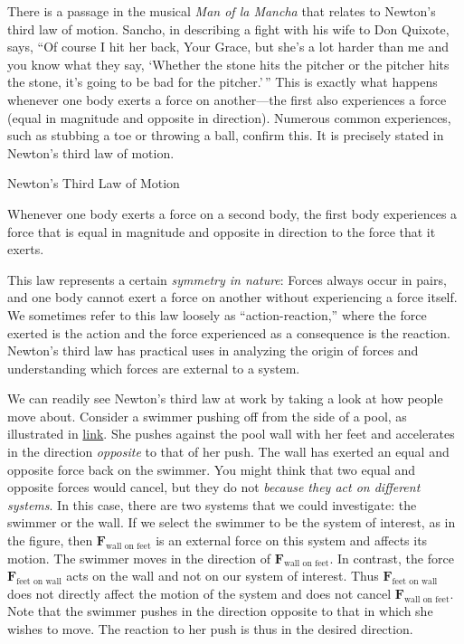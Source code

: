 \documentclass[
]{book}
\begin{document}
There is a passage in the musical \emph{Man of la
Mancha} that relates to Newton's third law
of motion. Sancho, in describing a fight with his wife to Don Quixote,
says, ``Of course I hit her back, Your Grace, but she's a lot harder than
me and you know what they say, `Whether the stone hits the pitcher or
the pitcher hits the stone, it's going to be bad for the pitcher.'\,'' This
is exactly what happens whenever one body exerts a force on
another---the first also experiences a force (equal in magnitude and
opposite in direction). Numerous common experiences, such as stubbing a
toe or throwing a ball, confirm this. It is precisely stated in
\protect\hypertarget{import-auto-id1260844}{}{Newton's third law of motion}.

\hypertarget{fs-id2688761}{}
Newton's Third Law of Motion

Whenever one body exerts a force on a second body, the first body
experiences a force that is equal in magnitude and opposite in direction
to the force that it exerts.

This law represents a certain \emph{symmetry in nature}: Forces always occur
in pairs, and one body cannot exert a force on another without
experiencing a force itself. We sometimes refer to this law loosely as
``action-reaction,'' where the force exerted is the action and the force
experienced as a consequence is the reaction. Newton's third law has
practical uses in analyzing the origin of forces and understanding which
forces are external to a system.

We can readily see Newton's third law at work by taking a look at how
people move about. Consider a swimmer pushing off from the side of a
pool, as illustrated in
\protect\hyperlink{import-auto-id2338100}{link}. She pushes
against the pool wall with her feet and accelerates in the direction
\emph{opposite} to that of her push. The wall has exerted an equal and
opposite force back on the swimmer. You might think that two equal and
opposite forces would cancel, but they do not \emph{because they act on
different systems}. In this case, there are two systems that we could
investigate: the swimmer or the wall. If we select the swimmer to be the
system of interest, as in the figure, then
\(\textbf{F}_{\text{wall\ on\ feet}}{}\) is an external force on this
system and affects its motion. The swimmer moves in the direction of
\(\textbf{F}_{\text{wall\ on\ feet}}{}\). In contrast, the force
\(\textbf{F}_{\text{feet\ on\ wall}}{}\) acts on the wall and not on our
system of interest. Thus \(\textbf{F}_{\text{feet\ on\ wall}}{}\) does not
directly affect the motion of the system and does not cancel
\(\textbf{F}_{\text{wall\ on\ feet}}{}\). Note that the swimmer pushes in
the direction opposite to that in which she wishes to move. The reaction
to her push is thus in the desired direction.
\end{document}
